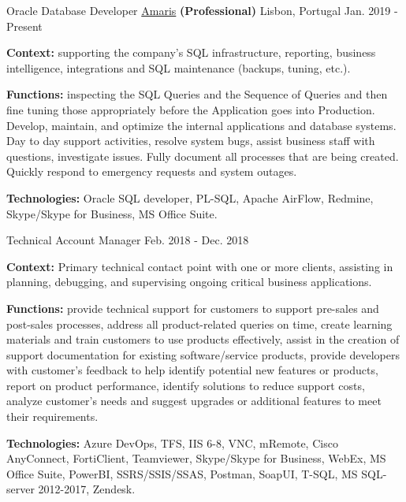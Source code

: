 \begin{cventries}

  \cventry
    {Oracle Database Developer} %
    {\href{https://www.amaris.com/}{Amaris} \textbf{(Professional)}} %
    {Lisbon, Portugal} %
    {Jan. 2019 - Present} %
    {
      \begin{cvitems} %
		\item {\textbf{Context:} supporting the company's SQL infrastructure, reporting, business intelligence, integrations and SQL maintenance (backups, tuning, etc.). 
}
		\item {\textbf{Functions:} inspecting the SQL Queries and the Sequence of Queries and then fine tuning those appropriately before the Application goes into Production. Develop, maintain, and optimize the internal applications and database systems. Day to day support activities, resolve system bugs, assist business staff with questions, investigate issues. Fully document all processes that are being created. Quickly respond to emergency requests and system outages.}		
		\item {\textbf{Technologies:} Oracle SQL developer, PL-SQL, Apache AirFlow, Redmine, Skype/Skype for Business, MS Office Suite.}		
      \end{cvitems}
    } 
    
  \cventry
    {Technical Account Manager} %
    {} %
    {} %
    {Feb. 2018 - Dec. 2018} %
    {
      \begin{cvitems} %
		\item {\textbf{Context:} Primary technical contact point with one or more clients, assisting in planning, debugging, and supervising ongoing critical business applications.}
		\item {\textbf{Functions:} provide technical support for customers to support pre-sales and post-sales processes, address all product-related queries on time, create learning materials and train customers to use products effectively, assist in the creation of support documentation for existing software/service products, provide developers with customer's feedback to help identify potential new features or products, report on product performance, identify solutions to reduce support costs, analyze customer's needs and suggest upgrades or additional features to meet their requirements.}		
		\item {\textbf{Technologies:} Azure DevOps, TFS, IIS 6-8, VNC, mRemote, Cisco AnyConnect, %
FortiClient, Teamviewer, Skype/Skype for Business, WebEx, MS Office Suite, PowerBI, SSRS/SSIS/SSAS, Postman, SoapUI, T-SQL, MS SQL-server 2012-2017, Zendesk.}		
      \end{cvitems}
    } 
    

\end{cventries}
